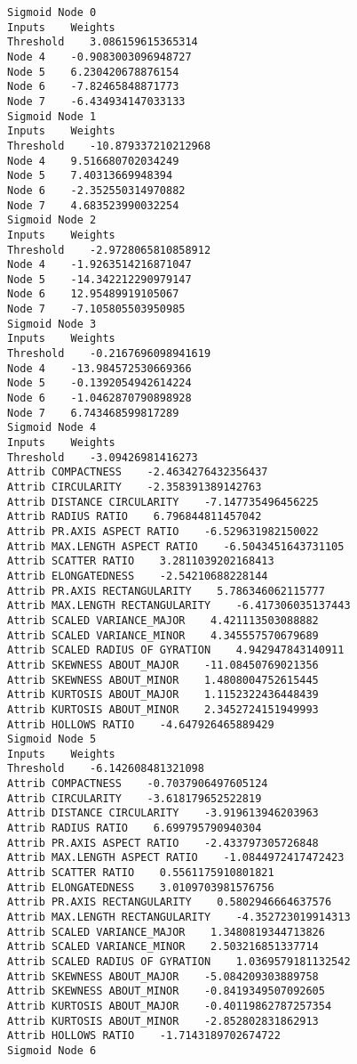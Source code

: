 \documentclass[
	article,			%
	11pt,				%
	oneside,			%
	a4paper,			%
	english,			%
	brazil,				%
	sumario=tradicional
	]{abntex2}
\begin{document}
\begin{lstlisting}
Sigmoid Node 0
Inputs    Weights
Threshold    3.086159615365314
Node 4    -0.9083003096948727
Node 5    6.230420678876154
Node 6    -7.82465848871773
Node 7    -6.434934147033133
Sigmoid Node 1
Inputs    Weights
Threshold    -10.879337210212968
Node 4    9.516680702034249
Node 5    7.40313669948394
Node 6    -2.352550314970882
Node 7    4.683523990032254
Sigmoid Node 2
Inputs    Weights
Threshold    -2.9728065810858912
Node 4    -1.9263514216871047
Node 5    -14.342212290979147
Node 6    12.95489919105067
Node 7    -7.105805503950985
Sigmoid Node 3
Inputs    Weights
Threshold    -0.2167696098941619
Node 4    -13.984572530669366
Node 5    -0.1392054942614224
Node 6    -1.0462870790898928
Node 7    6.743468599817289
Sigmoid Node 4
Inputs    Weights
Threshold    -3.09426981416273
Attrib COMPACTNESS    -2.4634276432356437
Attrib CIRCULARITY    -2.358391389142763
Attrib DISTANCE CIRCULARITY    -7.147735496456225
Attrib RADIUS RATIO    6.796844811457042
Attrib PR.AXIS ASPECT RATIO    -6.529631982150022
Attrib MAX.LENGTH ASPECT RATIO    -6.5043451643731105
Attrib SCATTER RATIO    3.2811039202168413
Attrib ELONGATEDNESS    -2.54210688228144
Attrib PR.AXIS RECTANGULARITY    5.786346062115777
Attrib MAX.LENGTH RECTANGULARITY    -6.417306035137443
Attrib SCALED VARIANCE_MAJOR    4.421113503088882
Attrib SCALED VARIANCE_MINOR    4.345557570679689
Attrib SCALED RADIUS OF GYRATION    4.942947843140911
Attrib SKEWNESS ABOUT_MAJOR    -11.08450769021356
Attrib SKEWNESS ABOUT_MINOR    1.4808004752615445
Attrib KURTOSIS ABOUT_MAJOR    1.1152322436448439
Attrib KURTOSIS ABOUT_MINOR    2.3452724151949993
Attrib HOLLOWS RATIO    -4.647926465889429
Sigmoid Node 5
Inputs    Weights
Threshold    -6.142608481321098
Attrib COMPACTNESS    -0.7037906497605124
Attrib CIRCULARITY    -3.618179652522819
Attrib DISTANCE CIRCULARITY    -3.919613946203963
Attrib RADIUS RATIO    6.699795790940304
Attrib PR.AXIS ASPECT RATIO    -2.433797305726848
Attrib MAX.LENGTH ASPECT RATIO    -1.0844972417472423
Attrib SCATTER RATIO    0.5561175910801821
Attrib ELONGATEDNESS    3.0109703981576756
Attrib PR.AXIS RECTANGULARITY    0.5802946664637576
Attrib MAX.LENGTH RECTANGULARITY    -4.352723019914313
Attrib SCALED VARIANCE_MAJOR    1.3480819344713826
Attrib SCALED VARIANCE_MINOR    2.503216851337714
Attrib SCALED RADIUS OF GYRATION    1.0369579181132542
Attrib SKEWNESS ABOUT_MAJOR    -5.084209303889758
Attrib SKEWNESS ABOUT_MINOR    -0.8419349507092605
Attrib KURTOSIS ABOUT_MAJOR    -0.40119862787257354
Attrib KURTOSIS ABOUT_MINOR    -2.852802831862913
Attrib HOLLOWS RATIO    -1.7143189702674722
Sigmoid Node 6

\end{lstlisting}
\end{document}
